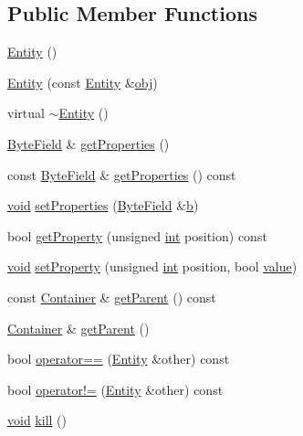 \subsection*{Public Member Functions}
\begin{DoxyCompactItemize}
\item 
\hyperlink{classmc_1_1_entity_ad583efd4016d2c77f6f60507b55fb6f8}{Entity} ()
\item 
\hyperlink{classmc_1_1_entity_a9b3dbd9aef3eb14da2e84a4352546835}{Entity} (const \hyperlink{classmc_1_1_entity}{Entity} \&\hyperlink{_s_d_l__opengl__glext_8h_a0c0d4701a6c89f4f7f0640715d27ab26}{obj})
\item 
virtual \hyperlink{classmc_1_1_entity_a5d546959498cbd99c27c0cd03cc95857}{$\sim$\+Entity} ()
\item 
\hyperlink{namespacemc_a4ed352b00f84d2c3e9843cf5ea375ca0}{Byte\+Field} \& \hyperlink{classmc_1_1_entity_afb7e498851027d6dfe5c6e4dbd2e1364}{get\+Properties} ()
\item 
const \hyperlink{namespacemc_a4ed352b00f84d2c3e9843cf5ea375ca0}{Byte\+Field} \& \hyperlink{classmc_1_1_entity_a0e026645818370ea5c5a72817558e89a}{get\+Properties} () const 
\item 
\hyperlink{_s_d_l__opengles2__gl2ext_8h_ae5d8fa23ad07c48bb609509eae494c95}{void} \hyperlink{classmc_1_1_entity_ae644b908a86a45da6d3620897205d942}{set\+Properties} (\hyperlink{namespacemc_a4ed352b00f84d2c3e9843cf5ea375ca0}{Byte\+Field} \&\hyperlink{_s_d_l__opengl__glext_8h_a0f71581a41fd2264c8944126dabbd010}{b})
\item 
bool \hyperlink{classmc_1_1_entity_ace44e845914092b907df3ecaaa50547d}{get\+Property} (unsigned \hyperlink{_s_d_l__thread_8h_a6a64f9be4433e4de6e2f2f548cf3c08e}{int} position) const 
\item 
\hyperlink{_s_d_l__opengles2__gl2ext_8h_ae5d8fa23ad07c48bb609509eae494c95}{void} \hyperlink{classmc_1_1_entity_ad771c3db0dadcd167df40fb04a1c10af}{set\+Property} (unsigned \hyperlink{_s_d_l__thread_8h_a6a64f9be4433e4de6e2f2f548cf3c08e}{int} position, bool \hyperlink{_s_d_l__opengl__glext_8h_a8ad81492d410ff2ac11f754f4042150f}{value})
\item 
const \hyperlink{classmc_1_1_container}{Container} \& \hyperlink{classmc_1_1_entity_a6ca2e4084875e5cde83b7e8b6fc012d3}{get\+Parent} () const 
\item 
\hyperlink{classmc_1_1_container}{Container} \& \hyperlink{classmc_1_1_entity_a1900c874fc79eb246d7ec01198264dc8}{get\+Parent} ()
\item 
bool \hyperlink{classmc_1_1_entity_a7918ed0bd53b9f09a0e57f9312eef4cc}{operator==} (\hyperlink{classmc_1_1_entity}{Entity} \&other) const 
\item 
bool \hyperlink{classmc_1_1_entity_a6cb31e44de7988da15b5e811f160c12d}{operator!=} (\hyperlink{classmc_1_1_entity}{Entity} \&other) const 
\item 
\hyperlink{_s_d_l__opengles2__gl2ext_8h_ae5d8fa23ad07c48bb609509eae494c95}{void} \hyperlink{classmc_1_1_entity_ac627ec2fd2977dee614b96cee332775f}{kill} ()
\end{DoxyCompactItemize}
